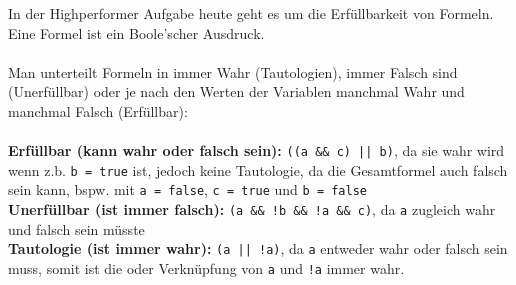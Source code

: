 \documentclass{../../sheet}
\begin{document}
\newpage
{}
In der Highperformer Aufgabe heute geht es um die Erfüllbarkeit von Formeln. Eine Formel ist ein Boole'scher Ausdruck. 
\\\\
Man unterteilt Formeln in immer Wahr (Tautologien), immer Falsch sind (Unerfüllbar) oder je nach den Werten der Variablen manchmal Wahr und manchmal Falsch (Erfüllbar):
\\\\
\textbf{Erfüllbar (kann wahr oder falsch sein): } \texttt{((a \&\& c) || b)}, da sie wahr wird wenn z.b. \texttt{b = true} ist, jedoch keine Tautologie, da die Gesamtformel auch falsch sein kann, bspw. mit \texttt{a = false}, \texttt{c = true} und \texttt{b = false}\\
\textbf{Unerfüllbar (ist immer falsch): } \texttt{(a \&\& !b \&\& !a \&\& c)}, da \texttt{a} zugleich wahr und falsch sein müsste\\
\textbf{Tautologie (ist immer wahr): } \texttt{(a || !a)}, da \texttt{a} entweder wahr oder falsch sein muss, somit ist die oder Verknüpfung von \texttt{a} und \texttt{!a} immer wahr.
\end{document}
